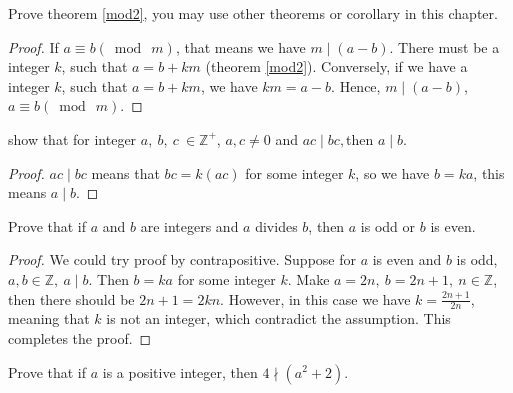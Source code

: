     \begin{exercise}
        Prove theorem \ref{mod2}, you may use other theorems or corollary in this chapter.
    \end{exercise}
    \begin{proof}
        If $a \equiv b (\bmod \ m)$, that means we have $m\mid(a-b)$. There must be a integer $k$, such that $a = b + km$ (theorem \ref{mod2}). Conversely, if we have a integer $k$, such that $a = b+km$, we have $km = a-b$. Hence, $m\mid(a-b)$, $a \equiv b (\bmod \ m)$.
    \end{proof}
    \begin{exercise}
        show that for integer $\displaystyle a,\ b,\ c\ \in \mathbb{Z}^{+}$, $\displaystyle a,c\neq 0$ and $\displaystyle ac\mid bc,$then $\displaystyle a\mid b$.
    \end{exercise}
    \begin{proof}
        $\displaystyle ac\mid bc$ means that $\displaystyle bc=k( ac)$ for some integer $\displaystyle k$, so we have $\displaystyle b=ka$, this means $\displaystyle a\mid b$.
    \end{proof}
    \begin{exercise}
        Prove that if $\displaystyle a$ and $\displaystyle b$ are integers and $\displaystyle a$ divides $\displaystyle b$, then $\displaystyle a$ is odd or $\displaystyle b$ is even.
    \end{exercise}
    \begin{proof}
        We could try proof by contrapositive. Suppose for $\displaystyle a$ is even and $\displaystyle b$ is odd, 
        $\displaystyle a,b\in \mathbb{Z} ,\ a\mid b$. Then $\displaystyle b=ka$ for some integer $\displaystyle k$. 
        Make $\displaystyle a=2n,\ b=2n+1,\ n\in \mathbb{Z}$, then there should be $\displaystyle 2n+1=2kn$. 
        However, in this case we have $\displaystyle k=\frac{2n+1}{2n}$, meaning that $\displaystyle k$ is not an 
        integer, which contradict the assumption. This completes the proof.
    \end{proof}
    \begin{exercise}
        Prove that if $a$ is a positive integer, then $4\nmid (a^2+2)$.
    \end{exercise}
